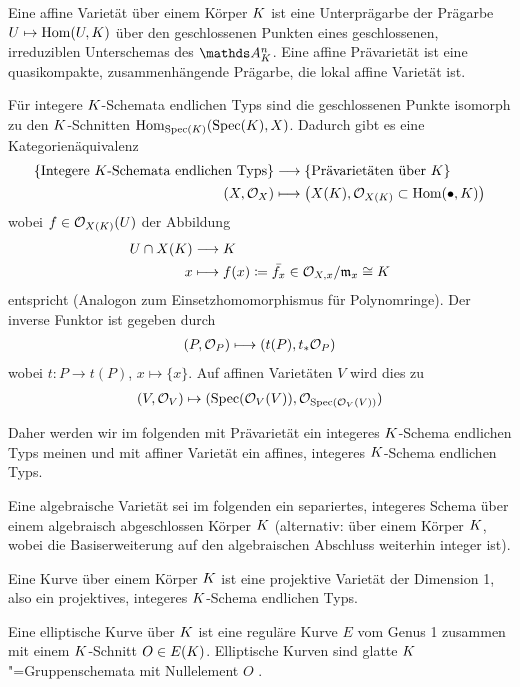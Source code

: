 \documentclass[german]{scrreprt}
\begin{document}
\begin{Definition}[Varietät]
  \cite[Theorem 3.37]{wedhorn}
  Eine affine Varietät über einem Körper $K$ ist eine Unterprägarbe der
  Prägarbe $U\mapsto \operatorname{Hom}(U,K)$ über den geschlossenen Punkten eines
  geschlossenen, irreduziblen Unterschemas des $\A_\K^n$.
  Eine affine Prävarietät ist eine quasikompakte, zusammenhängende
  Prägarbe, die lokal affine Varietät ist.

  Für integere $K$-Schemata endlichen Typs sind die geschlossenen
  Punkte isomorph zu den $K$-Schnitten 
  $\operatorname{Hom}_{\operatorname{Spec}(K)}(\operatorname{Spec}(K),X)$.
  Dadurch gibt es eine Kategorienäquivalenz
  \begin{align*}
    \left\{\text{Integere $K$-Schemata endlichen Typs}\right\}
    &\longrightarrow
      \left\{\text{Prävarietäten über $K$}\right\}\\
    (X,\mathcal{O}_X) 
    &\longmapsto
      \left( X(K), \mathcal{O}_{X(K)}\subset \operatorname{Hom}(\bullet, K) \right)
  \end{align*}
  wobei $f\in\mathcal{O}_{X(K)}(U)$ der Abbildung 
  \begin{align*}
    U\cap X(K) &\longrightarrow K\\
    x  &\longmapsto f(x)
         \coloneqq \bar{f_x}\in\mathcal{O}_{X,x}/\mathfrak{m}_x\cong K
  \end{align*}
  entspricht (Analogon zum Einsetzhomomorphismus für Polynomringe).
  Der inverse Funktor ist gegeben durch
  \begin{align*}
    (P,\mathcal{O}_P) \longmapsto (t(P), t_\ast\mathcal{O}_P) 
  \end{align*}
  wobei $t\colon P\to t(P)$, $x\mapsto \{x\}$. Auf affinen Varietäten
  $V$ wird dies zu
  \begin{gather*}
    (V, \mathcal{O}_V) \mapsto (\operatorname{Spec}(\mathcal{O}_V(V)), \mathcal{O}_{\operatorname{Spec}(\mathcal{O}_V(V))})
  \end{gather*}

  Daher werden wir im folgenden mit Prävarietät ein integeres
  $K$-Schema endlichen Typs meinen und mit affiner Varietät ein affines,
  integeres $K$-Schema endlichen Typs.

  Eine algebraische Varietät sei im folgenden ein separiertes, integeres
  Schema über einem algebraisch abgeschlossen Körper $K$
  (alternativ: über einem Körper $K$, wobei die Basiserweiterung auf
  den algebraischen Abschluss weiterhin integer ist).
\end{Definition}
\begin{Definition}
  Eine Kurve über einem Körper $K$ ist eine projektive Varietät der
  Dimension 1,
  also ein projektives, integeres $K$-Schema endlichen Typs.

  Eine elliptische Kurve über $K$ ist eine reguläre Kurve $E$ vom
  Genus 1 zusammen mit einem $K$-Schnitt $O\in E(K)$.
  Elliptische Kurven sind glatte \cite[Proposition III.3.1]{silverman}
  $K$"=Gruppenschemata mit Nullelement $O$ \cite{silverman}.
\end{Definition}


\nocite{*}
\printbibliography
\end{document}
